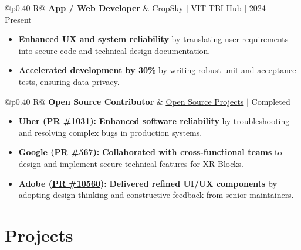 \documentclass[a4paper,11pt]{article}
\newcommand{\subheading}[1]{\textbf{#1}}
\newcommand{\meta}[1]{{\fontsize{10}{12}\selectfont\textcolor[HTML]{3A3A3A}{#1}}}
\newcommand{\ulink}[2]{\href{#1}{#2}}
\begin{document}
\begin{tabularx}{\linewidth}{@{}p{0.40\linewidth} R@{}}
\subheading{App / Web Developer} & \meta{\ulink{https://sites.google.com/view/cropsky/home}{CropSky} $|$ VIT-TBI Hub $|$ 2024 -- Present}
\end{tabularx}
\begin{itemize}[nosep, leftmargin=1.5em, itemsep=2pt, topsep=2pt]
  \item {\color[HTML]{0A0A0A}\fontsize{11}{14}\selectfont \textbf{Enhanced UX and system reliability} by translating user requirements into secure code and technical design documentation.}
  \item {\color[HTML]{0A0A0A}\fontsize{11}{14}\selectfont \textbf{Accelerated development by 30\%} by writing robust unit and acceptance tests, ensuring data privacy.}
\end{itemize}

\begin{tabularx}{\linewidth}{@{}p{0.40\linewidth} R@{}}
\subheading{Open Source Contributor} & \meta{\ulink{https://github.com/su-jin1425/My-Open-Source-Contributions}{Open Source Projects} $|$ Completed}
\end{tabularx}
\begin{itemize}[nosep, leftmargin=1.5em, itemsep=2pt, topsep=2pt]
  \item {\color[HTML]{0A0A0A}\fontsize{11}{14}\selectfont \textbf{Uber (\ulink{https://github.com/uber/causalml/pull/1031}{PR \#1031}):} \textbf{Enhanced software reliability} by troubleshooting and resolving complex bugs in production systems.}
  \item {\color[HTML]{0A0A0A}\fontsize{11}{14}\selectfont \textbf{Google (\ulink{https://github.com/google/xrblocks/pull/567}{PR \#567}):} \textbf{Collaborated with cross-functional teams} to design and implement secure technical features for XR Blocks.}
  \item {\color[HTML]{0A0A0A}\fontsize{11}{14}\selectfont \textbf{Adobe (\ulink{https://github.com/adobe/react-spectrum/pull/10560}{PR \#10560}):} \textbf{Delivered refined UI/UX components} by adopting design thinking and constructive feedback from senior maintainers.}
\end{itemize}

\section{Projects}
\vspace{2pt}
\end{document}
